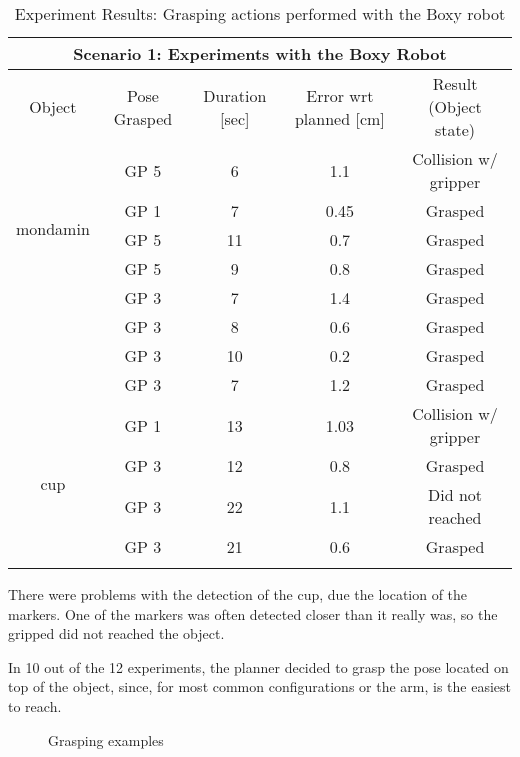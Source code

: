 {\small
\begin{center}
	\begin{longtable}[c]{ | c | c | c | c || c || }
		\hline
		\hline
		\multicolumn{5}{|c|}{Scenario 1: Experiments with the Boxy Robot} \\
		\hline
		\hline
		\endhead
		Object & Pose Grasped & Duration [sec] & Error wrt planned [cm] & Result (Object state) \\
 		\hline
		\multirow{5}{1.5cm}{mondamin}
		& GP 5 & 6 & 1.1 & Collision w/ gripper \\
		& GP 1 & 7 & 0.45 & Grasped \\
		& GP 5 & 11 & 0.7 & Grasped \\
		& GP 5 & 9 & 0.8 & Grasped \\
		\hline 
		\multirow{5}{1.5cm}{knorr tomate}
		& GP 3 & 7 & 1.4 & Grasped \\
		& GP 3 & 8 & 0.6 & Grasped \\
		& GP 3 & 10 & 0.2 & Grasped \\
		& GP 3 & 7 & 1.2 & Grasped \\		
		\hline
		\multirow{5}{1.5cm}{cup} & GP 1 & 13 & 1.03 &  Collision w/ gripper  \\
		& GP 3 & 12 & 0.8 & Grasped \\
		& GP 3 & 22 & 1.1 & Did not reached \\
		& GP 3 & 21 & 0.6 & Grasped \\	
		\hline
\caption{Experiment Results: Grasping actions performed with the Boxy robot}
\label{table:res_robot} 
\end{longtable}
\end{center}}
\vspace{-2cm}

There were problems with the detection of the cup, due the location of the markers. One of the markers was often detected closer than it really was, so the gripped did not reached the object.

In 10 out of the 12 experiments, the planner decided to grasp the pose located on top of the object, since, for most common configurations or the arm, is the easiest to reach.
\begin{figure}[H]
	\centering
	\begin{subfigure}
		{\texttt{[image: results/grasp\_cup.jpg]}}
	\end{subfigure}
	\begin{subfigure}
		{\texttt{[image: results/grasp\_knorr.jpg]}}
	\end{subfigure}
	\begin{subfigure}
	{\texttt{[image: results/grasp\_mon2.jpg]}}
	\end{subfigure}
	\vspace{-15pt}
	\caption[Grasping]{Grasping examples}
	\vspace{-10pt}
	\label{fig:grasp}
\end{figure}

